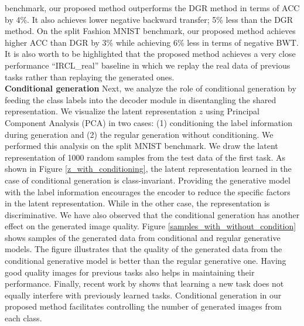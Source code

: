\documentclass[letterpaper]{article} %
\begin{document}
 benchmark, our proposed method outperforms the DGR method in terms of ACC by 4\%. It also achieves lower negative backward transfer; 5\% less than the DGR method. On the split Fashion MNIST benchmark, our proposed method achieves higher ACC than DGR by 3\% while achieving 6\% less in terms of negative BWT. It is also worth to be highlighted that the proposed method achieves a very close performance \enquote{IRCL\_real} baseline in which we replay the real data of previous tasks rather than replaying the generated ones.\\

\textbf{Conditional generation} Next, we analyze the role of conditional generation by feeding the class labels into the decoder module in disentangling the shared representation. We visualize the latent representation $z$ using Principal Component Analysis (PCA) \cite{wold1987principal} in two cases: (1) conditioning the label information during generation and (2) the regular generation without conditioning. We performed this analysis on the split MNIST benchmark. We draw the latent representation of 1000 random samples from the test data of the first task. As shown in Figure \ref{z_with_conditioning}, the latent representation learned in the case of conditional generation is class-invariant. Providing the generative model with the label information encourages the encoder to reduce the specific factors in the latent representation. While in the other case, the representation is discriminative. We have also observed that the conditional generation has another effect on the generated image quality. Figure \ref{samples_with_without_condition} shows samples of the generated data from conditional and regular generative models. The figure illustrates that the quality of the generated data from the conditional generative model is better than the regular generative one. Having good quality images for previous tasks also helps in maintaining their performance.  Finally, recent work by \cite{aljundi2019online} shows that learning a new task does not equally interfere with previously learned tasks. Conditional generation in our proposed method facilitates controlling the number of generated images from each class.\\
\end{document}

